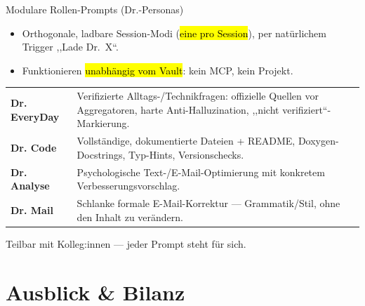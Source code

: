 \documentclass[aspectratio=169,11pt]{beamer}
\begin{document}
\begin{frame}{Modulare Rollen-Prompts (Dr.-Personas)}
  \begin{itemize}
    \item Orthogonale, ladbare Session-Modi (\hl{eine pro Session}),
          per natürlichem Trigger ,,Lade Dr.\ X``.
    \item Funktionieren \hl{unabhängig vom Vault}: kein MCP, kein Projekt.
  \end{itemize}
  \vspace{0.3em}
  \begin{center}
  \renewcommand{\arraystretch}{1.25}
  \begin{tabular}{@{}p{2.6cm}p{9.0cm}@{}}
    \toprule
    \textbf{\color{hhnblue}Dr. EveryDay} & Verifizierte Alltags-/Technikfragen:
      offizielle Quellen vor Aggregatoren, harte Anti-Halluzination,
      ,,nicht verifiziert``-Markierung. \\
    \textbf{\color{hhnblue}Dr. Code} & Vollständige, dokumentierte Dateien +
      README, Doxygen-Docstrings, Typ-Hints, Versionschecks. \\
    \textbf{\color{hhnblue}Dr. Analyse} & Psychologische Text-/E-Mail-Optimierung
      mit konkretem Verbesserungsvorschlag. \\
    \textbf{\color{hhnblue}Dr. Mail} & Schlanke formale E-Mail-Korrektur ---
      Grammatik/Stil, ohne den Inhalt zu verändern. \\
    \bottomrule
  \end{tabular}
  \end{center}
  \vspace{0.3em}
  {\footnotesize Teilbar mit Kolleg:innen --- jeder Prompt steht für sich.}
\end{frame}

\section{Ausblick \& Bilanz}
\end{document}
